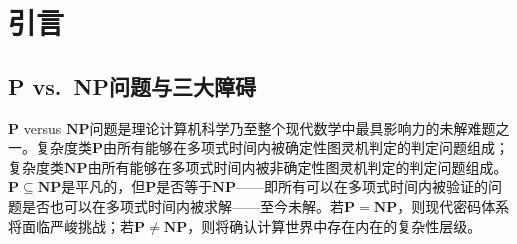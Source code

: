 \documentclass{ctexart}
\begin{document}
\begin{abstract}
		第三部分将抽象生成元$\alpha$具体化为代数数$\sqrt{2}$，引入实布尔图灵机（RBTM）和双带视角。虚带上的``1''直观地标记了``新维度''出现的位置，为后续的动态维度跟踪奠定了物理基础。我们证明了生成元无关性定理：计算能力不依赖于生成元的具体选择，无论使用$\sqrt{2}$、$\sqrt{3}$还是虚数单位$i$，相应的自动机都是同构的。这揭示了非确定性的本质在于``引入与基域不可公度的新元素''这一事实本身，而非生成元的代数身份。基于此，我们进一步揭示了伽罗瓦自同构的操作本质：它在计算树上的作用，就是将每条路径的所有非确定性选择全部翻转，即切换到其对偶路径。在虚部验证机（IVM）的动态扩张下，伽罗瓦群扩展为$(\mathbb{Z}/2\mathbb{Z})^m$，允许独立翻转单个非确定性选择点（单点敏感性），从而为精确刻画非确定性提供操作基础。我们据此提出了敏感性猜想：$\mathbf{NP}$完全语言的验证器必然具有不可消除的单点敏感性，而$\mathbf{P}$类语言可以完全不敏感。该猜想被证明等价于$\mathbf{P} \neq \mathbf{NP}$。这一等价性将P vs.\ NP问题从定量资源分析转化为定性结构判据，为后续研究提供了新的分析路径。
		
		本文所建立的框架为后续论文中虚部验证机（IVM）的动态维度追踪、本质维度$\kappa(L)$的定义、障碍无关性论证以及$\mathbf{P}\neq\mathbf{NP}$的严格分析提供了完整的模型基础。
		
		\vspace{0.5cm}
		\noindent \textbf{关键词：} 不可公度性，语法不变性，对偶性，操作不自足，复布尔图灵机，实布尔图灵机，代数语义，域扩张，非确定性计算，参数化猜想，生成元无关性，伽罗瓦自同构，敏感性猜想
	\end{abstract}
	
	\section{引言}
	
	\subsection{P vs.\ NP问题与三大障碍}
	
	$\mathbf{P}$ versus $\mathbf{NP}$问题\cite{cook1971,levin1973}是理论计算机科学乃至整个现代数学中最具影响力的未解难题之一。复杂度类$\mathbf{P}$由所有能够在多项式时间内被确定性图灵机判定的判定问题组成；复杂度类$\mathbf{NP}$由所有能够在多项式时间内被非确定性图灵机判定的判定问题组成。$\mathbf{P} \subseteq \mathbf{NP}$是平凡的，但$\mathbf{P}$是否等于$\mathbf{NP}$——即所有可以在多项式时间内被验证的问题是否也可以在多项式时间内被求解——至今未解。若$\mathbf{P} = \mathbf{NP}$，则现代密码体系将面临严峻挑战；若$\mathbf{P} \neq \mathbf{NP}$，则将确认计算世界中存在内在的复杂性层级。
	
\end{document}
